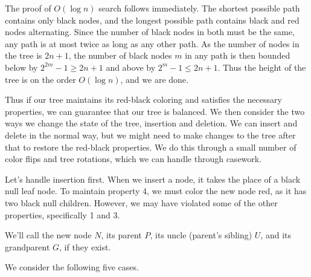 The proof of $O(\log{n})$ search follows immediately. The shortest possible path contains only black nodes, and the longest possible path contains black and red nodes alternating. Since the number of black nodes in both must be the same, any path is at most twice as long as any other path. As the number of nodes in the tree is $2n+1$, the number of black nodes $m$ in any path is then bounded below by $2^{2m} - 1 \ge 2n + 1$ and above by $2^{m} - 1 \le 2n + 1$. Thus the height of the tree is on the order $O(\log{n})$, and we are done.

Thus if our tree maintains its red-black coloring and satisfies the necessary properties, we can guarantee that our tree is balanced. We then consider the two ways we change the state of the tree, insertion and deletion. We can insert and delete in the normal way, but we might need to make changes to the tree after that to restore the red-black properties. We do this through a small number of color flips and tree rotations, which we can handle through casework.

Let's handle insertion first. When we insert a node, it takes the place of a black null leaf node. To maintain property 4, we must color the new node red, as it has two black null children. However, we may have violated some of the other properties, specifically 1 and 3.

We'll call the new node $N$, its parent $P$, its uncle (parent's sibling) $U$, and its grandparent $G$, if they exist.

We consider the following five cases.

